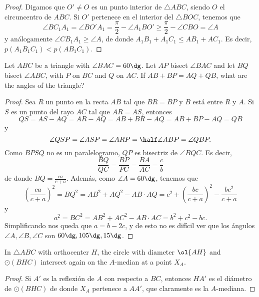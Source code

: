 \begin{proof}
	Digamos que $O'\ne O$ es un punto interior de $\triangle ABC$, siendo $O$ el circuncentro de $ABC$. Si $O'$ pertenece en el interior del $\triangle BOC$, tenemos que
	\[\angle BC_1A_1=\angle BO'A_1=\frac{\pi}{2}-\angle A_1BO'\ge\frac{\pi}{2}-\angle CBO=\angle A\]
	y análogamente $\angle CB_1A_1\ge\angle A$, de donde $A_1B_1+A_1C_1\le AB_1+AC_1$. Es decir, $p(A_1B_1C_1)<p(AB_1C_1)$.
\end{proof}

\begin{probEG}
	Let $ABC$ be a triangle with $\angle BAC=60\dg$. Let $AP$ bisect $\angle BAC$ and let $BQ$ bisect $\angle ABC$, with $P$ on $BC$ and $Q$ on $AC$. If $AB+BP=AQ+QB$, what are the angles of the triangle?
\end{probEG}

\begin{proof}
	Sea $R$ un punto en la recta $AB$ tal que $BR=BP$ y $B$ está entre $R$ y $A$. Si $S$ es un punto del rayo $AC$ tal que $AR=AS$, entonces
	\[QS=AS-AQ=AR-AQ=AB+BR-AQ=AB+BP-AQ=QB\]
	y
	\[\angle QSP=\angle ASP=\angle ARP=\half\angle ABP=\angle QBP.\]
	Como $BPSQ$ no es un paralelogramo, $QP$ es bisectriz de $\angle BQC$. Es decir,
	\[\frac{BQ}{QC}=\frac{BP}{PC}=\frac{BA}{AC}=\frac{c}{b}\]
	de donde $BQ=\frac{ca}{c+a}$. Además, como $\angle A=60\dg$, tenemos que
	\[\left(\frac{ca}{c+a}\right)^2=BQ^2=AB^2+AQ^2-AB\cdot AQ=c^2+\left(\frac{bc}{c+a}\right)^2-\frac{bc^2}{c+a}\]
	y
	\[a^2=BC^2=AB^2+AC^2-AB\cdot AC=b^2+c^2-bc.\]
	Simplificando nos queda que $a=b-2c$, y de esto no es difícil ver que los ángulos $\angle A,\angle B,\angle C$ son $60\dg,105\dg,15\dg$.
\end{proof}


\begin{probEG}
	In $\triangle ABC$ with orthocenter $H$, the circle with diameter $\ol{AH}$ and $\odot(BHC)$ intersect again on the $A$-median at a point $X_A$.
\end{probEG}

\begin{proof}
	Si $A'$ es la reflexión de $A$ con respecto a $BC$, entonces $HA'$ es el diámetro de $\odot(BHC)$ de donde $X_A$ pertenece a $AA'$, que claramente es la $A$-mediana.
\end{proof}

